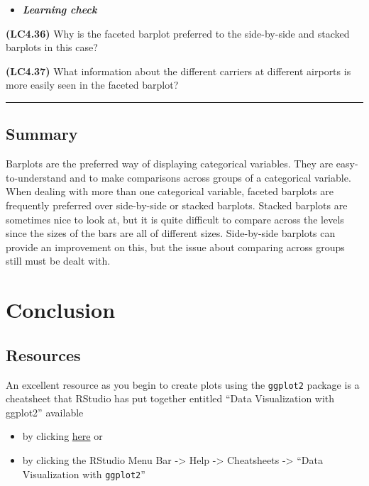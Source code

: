 \documentclass[]{tufte-book}
\let\oldrule=\rule
\renewcommand{\rule}[1]{\oldrule{\linewidth}}
\providecommand{\tightlist}{%
  \setlength{\itemsep}{0pt}\setlength{\parskip}{0pt}}
\newenvironment{rmdblock}[1]
  {\begin{shaded*}
  \begin{itemize}
  \renewcommand{\labelitemi}{
    \raisebox{-.7\height}[0pt][0pt]{
    }
  }
  \item
  }
  {
  \end{itemize}
  \end{shaded*}
  }
\newenvironment{learncheck}
  {\begin{rmdblock}{warning}}
  {\end{rmdblock}}
\begin{document}
\begin{learncheck}
\textbf{\emph{Learning check}}
\end{learncheck}

\textbf{(LC4.36)} Why is the faceted barplot preferred to the
side-by-side and stacked barplots in this case?

\textbf{(LC4.37)} What information about the different carriers at
different airports is more easily seen in the faceted barplot?

\begin{center}\rule{0.5\linewidth}{\linethickness}\end{center}

\subsection{Summary}\label{summary-4}

Barplots are the preferred way of displaying categorical variables. They
are easy-to-understand and to make comparisons across groups of a
categorical variable. When dealing with more than one categorical
variable, faceted barplots are frequently preferred over side-by-side or
stacked barplots. Stacked barplots are sometimes nice to look at, but it
is quite difficult to compare across the levels since the sizes of the
bars are all of different sizes. Side-by-side barplots can provide an
improvement on this, but the issue about comparing across groups still
must be dealt with.

\section{Conclusion}\label{conclusion}

\subsection{Resources}\label{resources}

An excellent resource as you begin to create plots using the
\texttt{ggplot2} package is a cheatsheet that RStudio has put together
entitled ``Data Visualization with ggplot2'' available

\begin{itemize}
\tightlist
\item
  by clicking
  \href{https://www.rstudio.com/wp-content/uploads/2016/11/ggplot2-cheatsheet-2.1.pdf}{here}
  or
\item
  by clicking the RStudio Menu Bar -\textgreater{} Help -\textgreater{}
  Cheatsheets -\textgreater{} ``Data Visualization with
  \texttt{ggplot2}''
\end{itemize}
\end{document}
